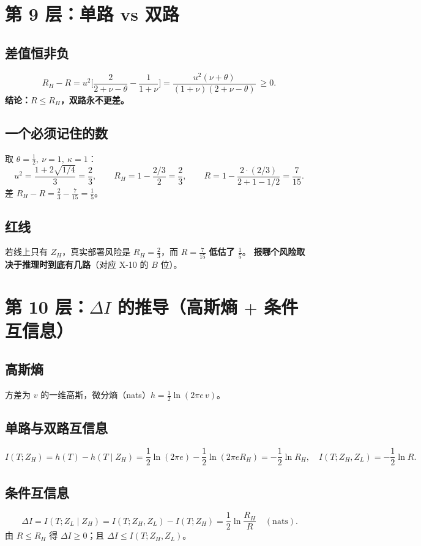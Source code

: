 \documentclass[UTF8,11pt,a4paper]{ctexart}
\begin{document}
\section{第 9 层：单路 vs 双路}

\subsection{差值恒非负}
\begin{equation}
R_H-R=u^2\Big[\frac{2}{2+\nu-\theta}-\frac{1}{1+\nu}\Big]
=\frac{u^2(\nu+\theta)}{(1+\nu)(2+\nu-\theta)}\ \ge0 . \label{eq:gap}
\end{equation}
\textbf{结论：$R\le R_H$，双路永不更差。}

\subsection{一个必须记住的数}
取 $\theta=\tfrac12,\ \nu=1,\ \kappa=1$：
\[
u^2=\frac{1+2\sqrt{1/4}}{3}=\frac23,\qquad
R_H=1-\frac{2/3}{2}=\frac23,\qquad
R=1-\frac{2\cdot(2/3)}{2+1-1/2}=\frac{7}{15}.
\]
差 $R_H-R=\frac23-\frac{7}{15}=\frac15$。

\subsection{红线}
若线上只有 $Z_H$，真实部署风险是 $R_H=\frac23$，而 $R=\frac{7}{15}$ \textbf{低估了 $\frac15$}。
\textbf{报哪个风险取决于推理时到底有几路}（对应 X-10 的 $B$ 位）。

\section{第 10 层：$\Delta I$ 的推导（高斯熵 $+$ 条件互信息）}

\subsection{高斯熵}
方差为 $v$ 的一维高斯，微分熵（nats）$h=\frac12\ln(2\pi e\,v)$。

\subsection{单路与双路互信息}
\begin{equation}
I(T;Z_H)=h(T)-h(T\mid Z_H)=\frac12\ln(2\pi e)-\frac12\ln(2\pi e R_H)=-\frac12\ln R_H,\quad
I(T;Z_H,Z_L)=-\frac12\ln R .
\end{equation}

\subsection{条件互信息}
\begin{equation}
\boxed{\,\Delta I=I(T;Z_L\mid Z_H)=I(T;Z_H,Z_L)-I(T;Z_H)=\frac12\ln\frac{R_H}{R}\quad(\text{nats}).} \label{eq:dI}
\end{equation}
由 $R\le R_H$ 得 $\Delta I\ge0$；且 $\Delta I\le I(T;Z_H,Z_L)$。
\end{document}
